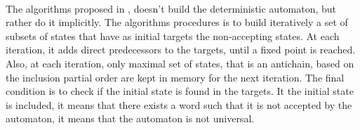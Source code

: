 \documentclass[letterpaper]{article}
\DeclarePairedDelimiter{\ceil}{\lceil}{\rceil}
\theoremstyle{definition}
\begin{document}


\paragraph{}

The algorithms proposed in \cite{AC_universality}, doesn't build
the deterministic automaton, but rather do it implicitly.
The algorithms procedures is to build iteratively a set of subsets of states
that have as initial targets the non-accepting states.
At each iteration,
it adds direct
predecessors to the targets, until a fixed point is reached.
Also, at each iteration,
only maximal set of states, that is an antichain,
based on the inclusion partial order are kept
in memory for the next iteration.
The final condition is to check if the initial state is found
in the targets. It the initial state is included, it means that
there exists a word such that it is not accepted by
the automaton, it means that the automaton is not universal.
\end{document}
